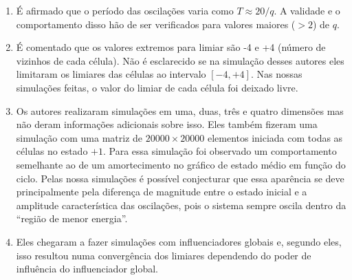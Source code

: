 \documentclass[12pt,a4paper,final]{article}
\begin{document}
\begin{enumerate}
    \item É afirmado que o período das oscilações varia como $T \approx 20 / q$. A validade e o comportamento disso hão de ser verificados para valores maiores ($>2$) de $q$.
    \item É comentado que os valores extremos para limiar são -4 e +4 (número de vizinhos de cada célula). Não é esclarecido se na simulação desses autores eles limitaram os limiares das células ao intervalo $[-4,+4]$. Nas nossas simulações feitas, o valor do limiar de cada célula foi deixado livre.
    \item Os autores realizaram simulações em uma, duas, três e quatro dimensões mas não deram informações adicionais sobre isso. Eles também fizeram uma simulação com uma matriz de $20000 \times 20000$ elementos iniciada com todas as células no estado $+1$. Para essa simulação foi observado um comportamento semelhante ao de um amortecimento no gráfico de estado médio em função do ciclo. Pelas nossa simulações é possível conjecturar que essa aparência se deve principalmente pela diferença de magnitude entre o estado inicial e a amplitude característica das oscilações, pois o sistema sempre oscila dentro da ``região de menor energia''.
    \item Eles chegaram a fazer simulações com influenciadores globais e, segundo eles, isso resultou numa convergência dos limiares dependendo do poder de influência do influenciador global.
  \end{enumerate}
  
\end{document}
